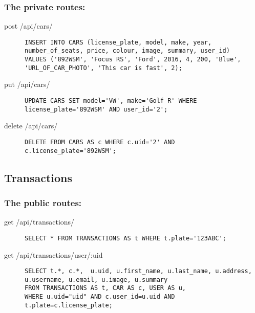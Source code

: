 \documentclass{article}
\begin{document}
\subsubsection{The private routes:}
\begin{description}
\item[post /api/cars/] \mbox{}
\begin{lstlisting}[style=sql]
INSERT INTO CARS (license_plate, model, make, year, number_of_seats, price, colour, image, summary, user_id)
VALUES ('892WSM', 'Focus RS', 'Ford', 2016, 4, 200, 'Blue', 'URL_OF_CAR_PHOTO', 'This car is fast', 2);
\end{lstlisting}
\item[put /api/cars/] \mbox{}
\begin{lstlisting}[style=sql]
UPDATE CARS SET model='VW', make='Golf R' WHERE license_plate='892WSM' AND user_id='2';
\end{lstlisting}
\item[delete /api/cars/] \mbox{}
\begin{lstlisting}[style=sql]
DELETE FROM CARS AS c WHERE c.uid='2' AND c.license_plate='892WSM';
\end{lstlisting}
\end{description}

\subsection{Transactions}
\subsubsection{The public routes:}
\begin{description}
\item[get /api/transactions/] \mbox{}
\begin{lstlisting}[style=sql]
SELECT * FROM TRANSACTIONS AS t WHERE t.plate='123ABC';
\end{lstlisting}
\item[get /api/transactions/user/:uid] \mbox{}
\begin{lstlisting}[style=sql]
SELECT t.*, c.*,  u.uid, u.first_name, u.last_name, u.address, u.username, u.email, u.image, u.summary
FROM TRANSACTIONS AS t, CAR AS c, USER AS u,
WHERE u.uid="uid" AND c.user_id=u.uid AND t.plate=c.license_plate;
\end{lstlisting}
\end{description}
\end{document}
